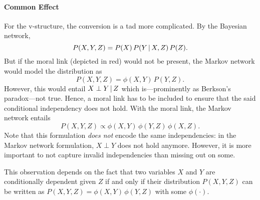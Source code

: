 		\paragraph{Common Effect}
			\begin{center}
			\end{center}
			For the v-structure, the conversion is a tad more complicated. By the Bayesian network,
			\begin{equation}
				P(X, Y, Z) = P(X) \, P(Y \,\vert\, X, Z) \, P(Z).
			\end{equation}
			But if the moral link (depicted in {\color{TUDa-9b} red}) would not be present, the Markov network would model the distribution as
			\begin{equation}
				P(X, Y, Z) = \phi(X, Y) \, P(Y, Z).
			\end{equation}
			However, this would entail \( X \perp Y \,\vert\, Z \) which is---prominently as Berkson's paradox---not true. Hence, a moral link has to be included to ensure that the said conditional independency does not hold. With the moral link, the Markov network entails
			\begin{equation}
				P(X, Y, Z) \propto \phi(X, Y) \, \phi(Y, Z) \, \phi(X, Z).
			\end{equation}
			Note that this formulation \emph{does not} encode the same independencies: in the Markov network formulation, \( X \perp Y \) does not hold anymore. However, it is more important to not capture invalid independencies than missing out on some.

			This observation depends on the fact that two variables \(X\) and \(Y\) are conditionally dependent given \(Z\) if and only if their distribution \( P(X, Y, Z) \) can be written as \( P(X, Y, Z) = \phi(X, Y) \, \phi(Y, Z) \) with some \(\phi(\cdot)\).

